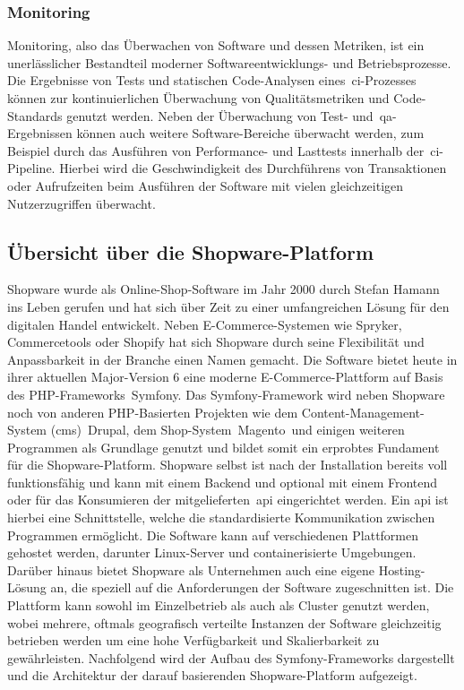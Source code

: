 \subsubsection{Monitoring}

Monitoring, also das Überwachen von Software und dessen Metriken, ist ein unerlässlicher Bestandteil moderner
Softwareentwicklungs- und Betriebsprozesse.
Die Ergebnisse von Tests und statischen Code-Analysen eines\ \acrshort{ci}-Prozesses können zur kontinuierlichen
Überwachung von Qualitätsmetriken und Code-Standards genutzt werden.
Neben der Überwachung von Test- und\ \acrshort{qa}-Ergebnissen können auch weitere Software-Bereiche überwacht werden,
zum Beispiel durch das Ausführen von Performance- und Lasttests innerhalb der\ \acrshort{ci}-Pipeline.
Hierbei wird die Geschwindigkeit des Durchführens von Transaktionen oder Aufrufzeiten beim Ausführen
der Software mit vielen gleichzeitigen Nutzerzugriffen überwacht.

\subsection{Übersicht über die Shopware-Platform} \label{subsec:02-background-3}

Shopware wurde als Online-Shop-Software im Jahr 2000 durch Stefan Hamann ins Leben gerufen
und hat sich über Zeit zu einer umfangreichen Lösung für den digitalen Handel entwickelt.
Neben E-Commerce-Systemen wie Spryker, Commercetools oder Shopify hat sich Shopware durch seine Flexibilität und
Anpassbarkeit in der Branche einen Namen gemacht.
Die Software bietet heute in ihrer aktuellen Major-Version 6 eine moderne E-Commerce-Plattform auf Basis des
PHP-Frameworks\ \glqq Symfony\grqq.
Das Symfony-Framework wird neben Shopware noch von anderen PHP-Basierten Projekten wie dem Content-Management-System
(\acrshort{cms})\ \glqq Drupal\grqq, dem Shop-System\ \glqq Magento\grqq\ und einigen weiteren
Programmen als Grundlage genutzt und bildet somit ein erprobtes Fundament für die
Shopware-Platform.
Shopware selbst ist nach der Installation bereits voll funktionsfähig und kann mit einem Backend und optional
mit einem Frontend oder für das Konsumieren der mitgelieferten\ \acrshort{api} eingerichtet werden.
Ein \acrfull{api} ist hierbei eine Schnittstelle, welche die standardisierte
Kommunikation zwischen Programmen ermöglicht.
Die Software kann auf verschiedenen Plattformen gehostet werden, darunter Linux-Server und containerisierte Umgebungen.
Darüber hinaus bietet Shopware als Unternehmen auch eine eigene Hosting-Lösung an, die speziell auf die Anforderungen
der Software zugeschnitten ist.
Die Plattform kann sowohl im Einzelbetrieb als auch als Cluster genutzt werden, wobei mehrere, oftmals geografisch
verteilte Instanzen der Software gleichzeitig betrieben werden um eine hohe Verfügbarkeit und Skalierbarkeit zu
gewährleisten.
Nachfolgend wird der Aufbau des Symfony-Frameworks dargestellt und die Architektur der darauf basierenden
Shopware-Platform aufgezeigt.


